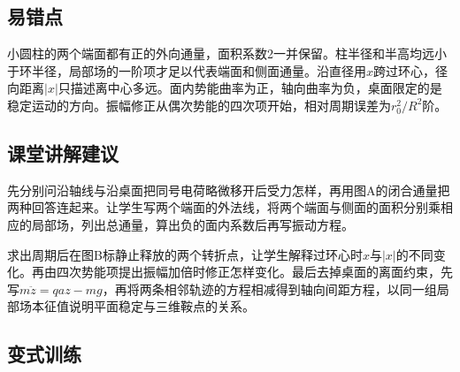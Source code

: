 \documentclass[UTF8,fontset=fandol,a4paper,11pt]{ctexart}
\begin{document}

\subsection*{易错点}

小圆柱的两个端面都有正的外向通量，面积系数2一并保留。柱半径和半高均远小于环半径，局部场的一阶项才足以代表端面和侧面通量。沿直径用$x$跨过环心，径向距离$|x|$只描述离中心多远。面内势能曲率为正，轴向曲率为负，桌面限定的是稳定运动的方向。振幅修正从偶次势能的四次项开始，相对周期误差为$r_0^2/R^2$阶。



\subsection*{课堂讲解建议}

先分别问沿轴线与沿桌面把同号电荷略微移开后受力怎样，再用图A的闭合通量把两种回答连起来。让学生写两个端面的外法线，将两个端面与侧面的面积分别乘相应的局部场，列出总通量，算出负的面内系数后再写振动方程。

求出周期后在图B标静止释放的两个转折点，让学生解释过环心时$x$与$|x|$的不同变化。再由四次势能项提出振幅加倍时修正怎样变化。最后去掉桌面的离面约束，先写$m\ddot z=qa z-mg$，再将两条相邻轨迹的方程相减得到轴向间距方程，以同一组局部场本征值说明平面稳定与三维鞍点的关系。



\subsection*{变式训练}
\end{document}
